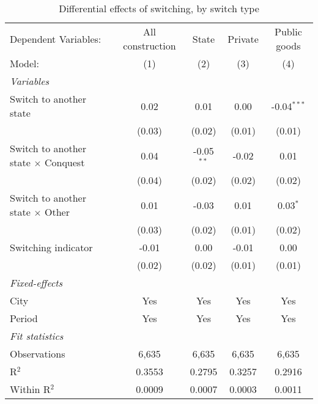 \begin{table}[htbp]
   \caption{\label{tab:baseline_50y} Differential effects of switching, by switch type}
   \centering
   \begin{tabular}{lcccc}
      \tabularnewline \midrule \midrule
      Dependent Variables:                       & All construction & State        & Private & Public goods\\  
      Model:                                     & (1)              & (2)          & (3)     & (4)\\  
      \midrule
      \emph{Variables}\\
      Switch to another state                    & 0.02             & 0.01         & 0.00    & -0.04$^{***}$\\   
                                                 & (0.03)           & (0.02)       & (0.01)  & (0.01)\\   
      Switch to another state $\times$ Conquest  & 0.04             & -0.05$^{**}$ & -0.02   & 0.01\\   
                                                 & (0.04)           & (0.02)       & (0.02)  & (0.02)\\   
      Switch to another state $\times$ Other     & 0.01             & -0.03        & 0.01    & 0.03$^{*}$\\   
                                                 & (0.03)           & (0.02)       & (0.01)  & (0.02)\\   
      Switching indicator                        & -0.01            & 0.00         & -0.01   & 0.00\\   
                                                 & (0.02)           & (0.02)       & (0.01)  & (0.01)\\   
      \midrule
      \emph{Fixed-effects}\\
      City                                       & Yes              & Yes          & Yes     & Yes\\  
      Period                                     & Yes              & Yes          & Yes     & Yes\\  
      \midrule
      \emph{Fit statistics}\\
      Observations                               & 6,635            & 6,635        & 6,635   & 6,635\\  
      R$^2$                                      & 0.3553           & 0.2795       & 0.3257  & 0.2916\\  
      Within R$^2$                               & 0.0009           & 0.0007       & 0.0003  & 0.0011\\  
      \midrule \midrule
      

\end{tabular}
\end{table}
